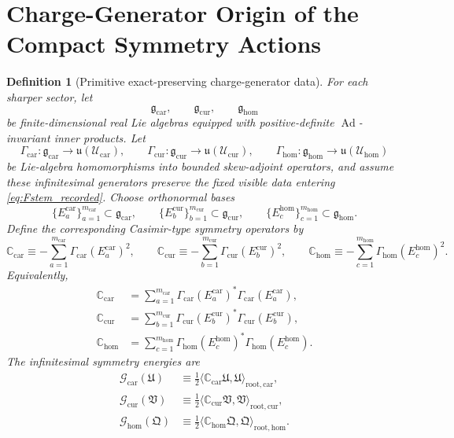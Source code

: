 \documentclass[11pt]{article}
\newcommand{\RootTensorClass}{\mathscr U_{\mathrm{car}}}
\newcommand{\RootRelabelClass}{\mathscr U_{\mathrm{cur}}}
\newcommand{\RootFreeClass}{\mathscr U_{\mathrm{hom}}}
\newcommand{\RootTensor}{\mathfrak U}
\newcommand{\RootRelabel}{\mathfrak V}
\newcommand{\RootFree}{\mathfrak Q}
\newcommand{\TensorChargeAlg}{\mathfrak g_{\mathrm{car}}}
\newcommand{\CurChargeAlg}{\mathfrak g_{\mathrm{cur}}}
\newcommand{\HomChargeAlg}{\mathfrak g_{\mathrm{hom}}}
\newcommand{\TensorGen}{\Gamma_{\mathrm{car}}}
\newcommand{\CurGen}{\Gamma_{\mathrm{cur}}}
\newcommand{\HomGen}{\Gamma_{\mathrm{hom}}}
\newcommand{\TensorCasimir}{\mathbb C_{\mathrm{car}}}
\newcommand{\CurCasimir}{\mathbb C_{\mathrm{cur}}}
\newcommand{\HomCasimir}{\mathbb C_{\mathrm{hom}}}
\newtheorem{definition}{Definition}
\begin{document}
\section{Charge-Generator Origin of the Compact Symmetry Actions}

\begin{definition}[Primitive exact-preserving charge-generator data]
\label{def:charge_generators}
For each sharper sector, let
\[
\TensorChargeAlg,\qquad
\CurChargeAlg,\qquad
\HomChargeAlg
\]
be finite-dimensional real Lie algebras equipped with positive-definite \(\operatorname{Ad}\)-invariant inner products. Let
\[
\TensorGen:\TensorChargeAlg\to\mathfrak u(\RootTensorClass),\qquad
\CurGen:\CurChargeAlg\to\mathfrak u(\RootRelabelClass),\qquad
\HomGen:\HomChargeAlg\to\mathfrak u(\RootFreeClass)
\]
be Lie-algebra homomorphisms into bounded skew-adjoint operators, and assume these infinitesimal generators preserve the fixed visible data entering \eqref{eq:Fstem_recorded}. Choose orthonormal bases
\[
\{E_a^{\mathrm{car}}\}_{a=1}^{m_{\mathrm{car}}}\subset\TensorChargeAlg,\qquad
\{E_b^{\mathrm{cur}}\}_{b=1}^{m_{\mathrm{cur}}}\subset\CurChargeAlg,\qquad
\{E_c^{\mathrm{hom}}\}_{c=1}^{m_{\mathrm{hom}}}\subset\HomChargeAlg.
\]
Define the corresponding Casimir-type symmetry operators by
\begin{equation}
\TensorCasimir
\equiv
-\sum_{a=1}^{m_{\mathrm{car}}}\TensorGen(E_a^{\mathrm{car}})^2,
\qquad
\CurCasimir
\equiv
-\sum_{b=1}^{m_{\mathrm{cur}}}\CurGen(E_b^{\mathrm{cur}})^2,
\qquad
\HomCasimir
\equiv
-\sum_{c=1}^{m_{\mathrm{hom}}}\HomGen(E_c^{\mathrm{hom}})^2.
\label{eq:casimirs}
\end{equation}
Equivalently,
\begin{equation}
\begin{aligned}
\TensorCasimir
&=
\sum_{a=1}^{m_{\mathrm{car}}}\TensorGen(E_a^{\mathrm{car}})^*\TensorGen(E_a^{\mathrm{car}}),
\\
\CurCasimir
&=
\sum_{b=1}^{m_{\mathrm{cur}}}\CurGen(E_b^{\mathrm{cur}})^*\CurGen(E_b^{\mathrm{cur}}),
\\
\HomCasimir
&=
\sum_{c=1}^{m_{\mathrm{hom}}}\HomGen(E_c^{\mathrm{hom}})^*\HomGen(E_c^{\mathrm{hom}}).
\end{aligned}
\label{eq:casimir_positive}
\end{equation}
The infinitesimal symmetry energies are
\begin{equation}
\begin{aligned}
\mathcal G_{\mathrm{car}}(\RootTensor)
&\equiv
\frac12\langle \TensorCasimir\RootTensor,\RootTensor\rangle_{\mathrm{root,car}},
\\
\mathcal G_{\mathrm{cur}}(\RootRelabel)
&\equiv
\frac12\langle \CurCasimir\RootRelabel,\RootRelabel\rangle_{\mathrm{root,cur}},
\\
\mathcal G_{\mathrm{hom}}(\RootFree)
&\equiv
\frac12\langle \HomCasimir\RootFree,\RootFree\rangle_{\mathrm{root,hom}}.
\end{aligned}
\label{eq:generator_energies}
\end{equation}
\end{definition}
\end{document}
